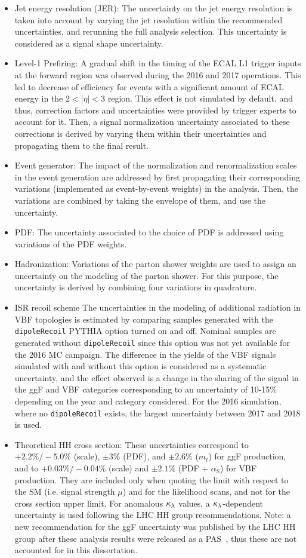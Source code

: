 \begin{itemize}
    \item {Jet energy resolution (JER):} The uncertainty on the jet energy resolution is taken into account by varying the jet resolution within the recommended uncertainties, and rerunning the full analysis selection. This uncertainty is considered as a signal shape uncertainty.
    \item {Level-1 Prefiring:} A gradual shift in the timing of the ECAL L1 trigger inputs at the forward region was observed during the 2016 and 2017 operations. This led to decrease of efficiency for events with a significant amount of ECAL energy in the $2<|\eta|<3$ region. This effect is not simulated by default. and thus, correction factors and uncertainties were provided by trigger experts to account for it. Then, a signal normalization uncertainty associated to these corrections is derived by varying them within their uncertainties and propagating them to the final result.
    \item {Event generator:} The impact of the normalization and renormalization scales in the event generation are addressed by first propagating their corresponding variations (implemented as event-by-event weights) in the analysis. Then, the variations are combined by taking the envelope of them, and use the uncertainty.
    \item {PDF:} The uncertainty associated to the choice of PDF is addressed using variations of the PDF weights.
    \item {Hadronization:} Variations of the parton shower weights are used to assign an uncertainty on the modeling of the parton shower. For this purpose, the uncertainty is derived by combining four variations in quadrature.
    \item {ISR recoil scheme} The uncertainties in the modeling of additional radiation in VBF topologies is estimated by comparing samples generated with the \texttt{dipoleRecoil} PYTHIA option turned on and off. Nominal samples are generated without \texttt{dipoleRecoil} since this option was not yet available for the 2016 MC campaign. The difference in the yields of the VBF signals simulated with and without this option is considered as a systematic uncertainty, and the effect observed is a change in the sharing of the signal in the ggF and VBF categories corresponding to an uncertainty of 10-15\% depending on the year and category considered. For the 2016 simulation, where no \texttt{dipoleRecoil} exists, the largest uncertainty between 2017 and 2018 is used.
    \item {Theoretical HH cross section:} These uncertainties correspond to $+2.2\%/-5.0\%$ (scale), $\pm 3\%$ (PDF), and $\pm 2.6\%$ ($m_{t}$) for ggF production, and to $+0.03\%/-0.04\%$ (scale) and $\pm 2.1\%$ (PDF + $\alpha_\text{S}$) for VBF production. They are included only when quoting the limit with respect to the SM (i.e. signal strength $\mu$) and for the likelihood scans, and not for the cross section upper limit. For anomalous $\kappa_{\lambda}$ values, a $\kappa_{\lambda}$-dependent uncertainty is used following the LHC HH group recommendations. Note: a new recommendation for the ggF uncertainty was published by the LHC HH group after these analysis results were released as a PAS~\cite{thesispas}, thus these are not accounted for in this dissertation.

\end{itemize}
